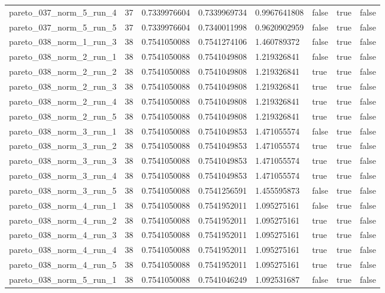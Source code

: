 \begin{tabular}{@{}llllllll@{}}
pareto\_037\_norm\_5\_run\_4 & 37 & 0.7339976604 & 0.7339969734 & 0.9967641808 & false & true & false \\
pareto\_037\_norm\_5\_run\_5 & 37 & 0.7339976604 & 0.7340011998 & 0.9620902959 & false & true & false \\
pareto\_038\_norm\_1\_run\_3 & 38 & 0.7541050088 & 0.7541274106 & 1.460789372 & false & true & false \\
pareto\_038\_norm\_2\_run\_1 & 38 & 0.7541050088 & 0.7541049808 & 1.219326841 & false & true & false \\
pareto\_038\_norm\_2\_run\_2 & 38 & 0.7541050088 & 0.7541049808 & 1.219326841 & true & true & false \\
pareto\_038\_norm\_2\_run\_3 & 38 & 0.7541050088 & 0.7541049808 & 1.219326841 & true & true & false \\
pareto\_038\_norm\_2\_run\_4 & 38 & 0.7541050088 & 0.7541049808 & 1.219326841 & true & true & false \\
pareto\_038\_norm\_2\_run\_5 & 38 & 0.7541050088 & 0.7541049808 & 1.219326841 & true & true & false \\
pareto\_038\_norm\_3\_run\_1 & 38 & 0.7541050088 & 0.7541049853 & 1.471055574 & false & true & false \\
pareto\_038\_norm\_3\_run\_2 & 38 & 0.7541050088 & 0.7541049853 & 1.471055574 & true & true & false \\
pareto\_038\_norm\_3\_run\_3 & 38 & 0.7541050088 & 0.7541049853 & 1.471055574 & true & true & false \\
pareto\_038\_norm\_3\_run\_4 & 38 & 0.7541050088 & 0.7541049853 & 1.471055574 & true & true & false \\
pareto\_038\_norm\_3\_run\_5 & 38 & 0.7541050088 & 0.7541256591 & 1.455595873 & false & true & false \\
pareto\_038\_norm\_4\_run\_1 & 38 & 0.7541050088 & 0.7541952011 & 1.095275161 & false & true & false \\
pareto\_038\_norm\_4\_run\_2 & 38 & 0.7541050088 & 0.7541952011 & 1.095275161 & true & true & false \\
pareto\_038\_norm\_4\_run\_3 & 38 & 0.7541050088 & 0.7541952011 & 1.095275161 & true & true & false \\
pareto\_038\_norm\_4\_run\_4 & 38 & 0.7541050088 & 0.7541952011 & 1.095275161 & true & true & false \\
pareto\_038\_norm\_4\_run\_5 & 38 & 0.7541050088 & 0.7541952011 & 1.095275161 & true & true & false \\
pareto\_038\_norm\_5\_run\_1 & 38 & 0.7541050088 & 0.7541046249 & 1.092531687 & false & true & false \\

\end{tabular}
